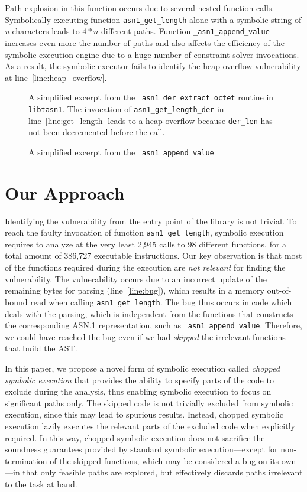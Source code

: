 Path explosion in this function occurs due to several nested function
calls. Symbolically executing function \texttt{asn1\_get\_length} alone with
a symbolic string of \textit{n} characters leads to $4*n$ different paths.
Function \texttt{\_asn1\_append\_value} increases even more the number
of paths and also affects the efficiency of the symbolic execution
engine due to a huge number of constraint solver invocations. As a
result, the symbolic executor fails to identify the heap-overflow
vulnerability at line~\ref{line:heap_overflow}.

\begin{figure}

\caption{
A simplified excerpt from the \texttt{\_asn1\_der\_extract\_octet} routine
in \texttt{libtasn1}. The invocation of \texttt{asn1\_get\_length\_der} in
line~\ref{line:get_length} leads to a heap overflow because
\texttt{der\_len} has not been decremented before the call.
}
\label{fig:intro-1}
\end{figure}

\begin{figure}

\caption{A simplified excerpt from the \texttt{\_asn1\_append\_value}}
\label{fig:intro-2}
\end{figure}

\section{Our Approach}
Identifying the vulnerability from the entry point of the library is not trivial.
To reach the faulty invocation of function \texttt{asn1\_get\_length},
symbolic execution requires to analyze at the very least 2,945 calls
to 98 different functions, for a total amount of 386,727 executable
instructions. Our key observation is that most of the functions
required during the execution are \textit{not relevant} for finding
the vulnerability. The vulnerability occurs due to an incorrect update
of the remaining bytes for parsing (line~\ref{line:bug}), which
results in a memory out-of-bound read when calling
\texttt{asn1\_get\_length}. The bug thus occurs in code which deals with the
parsing, which is independent from the functions that constructs the
corresponding ASN.1 representation, such as \texttt{\_asn1\_append\_value}.
Therefore, we could have reached the bug even if we had \emph{skipped}
the irrelevant functions that build the AST.

In this paper, we propose a novel form of symbolic execution called
\emph{chopped symbolic execution} that provides the ability to specify
parts of the code to exclude during the analysis, thus enabling
symbolic execution to focus on significant paths only. The skipped
code is not trivially excluded from symbolic execution, since this may
lead to spurious results. Instead, chopped symbolic execution lazily
executes the relevant parts of the excluded code when explicitly
required. In this way, chopped symbolic execution does not sacrifice
the soundness guarantees provided by standard symbolic
execution---except for non-termination of the skipped functions, which
may be considered a bug on its own---in that only feasible paths are
explored, but effectively discards paths irrelevant to the task at
hand.

